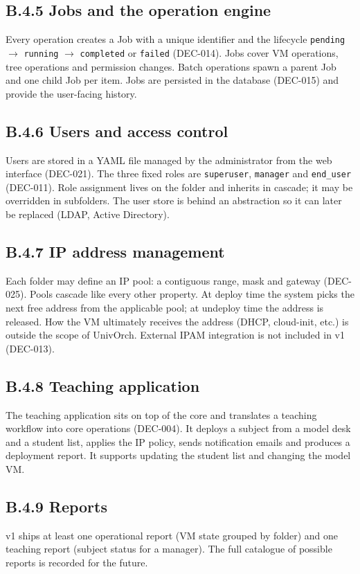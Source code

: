 \subsection*{B.4.5 Jobs and the operation engine}
Every operation creates a Job with a unique identifier and the
lifecycle \texttt{pending} $\to$ \texttt{running} $\to$
\texttt{completed} or \texttt{failed} (DEC-014). Jobs cover VM
operations, tree operations and permission changes. Batch
operations spawn a parent Job and one child Job per item. Jobs are
persisted in the database (DEC-015) and provide the user-facing
history.

\subsection*{B.4.6 Users and access control}
Users are stored in a YAML file managed by the administrator from
the web interface (DEC-021). The three fixed roles are
\texttt{superuser}, \texttt{manager} and \texttt{end\_user}
(DEC-011). Role assignment lives on the folder and inherits in
cascade; it may be overridden in subfolders. The user store is
behind an abstraction so it can later be replaced (LDAP, Active
Directory).

\subsection*{B.4.7 IP address management}
Each folder may define an IP pool: a contiguous range, mask and
gateway (DEC-025). Pools cascade like every other property. At
deploy time the system picks the next free address from the
applicable pool; at undeploy time the address is released. How the
VM ultimately receives the address (DHCP, cloud-init, etc.) is
outside the scope of UnivOrch. External IPAM integration is not
included in v1 (DEC-013).

\subsection*{B.4.8 Teaching application}
The teaching application sits on top of the core and translates a
teaching workflow into core operations (DEC-004). It deploys a
subject from a model desk and a student list, applies the IP
policy, sends notification emails and produces a deployment
report. It supports updating the student list and changing the
model VM.

\subsection*{B.4.9 Reports}
v1 ships at least one operational report (VM state grouped by
folder) and one teaching report (subject status for a manager).
The full catalogue of possible reports is recorded for the future.

